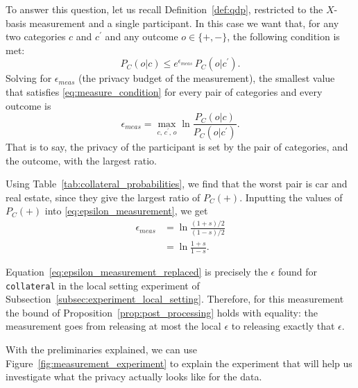 \documentclass{ieeeaccess}
\begin{document}
To answer this question, let us recall Definition~\ref{def:qdp}, restricted to the $X$-basis measurement and a single participant. In this case we want that, for any two categories $c$ and $c^{\prime}$ and any outcome $o \in \{+, -\}$, the following condition is met:
\begin{equation}
  P_C(o|c) \leq e^{\epsilon_{meas}}\, P_C(o|c^{\prime}).
  \label{eq:measure_condition}
\end{equation}
Solving for $\epsilon_{meas}$ (the privacy budget of the measurement), the smallest value that satisfies \eqref{eq:measure_condition} for every pair of categories and every outcome is
\begin{equation}
  \epsilon_{meas} = \max_{c,\, c^{\prime},\, o} \ln\frac{P_C(o|c)}{P_C(o|c^{\prime})}.
  \label{eq:epsilon_measurement}
\end{equation}
That is to say, the privacy of the participant is set by the pair of categories, and the outcome, with the largest ratio.

Using Table~\ref{tab:collateral_probabilities}, we find that the worst pair is car and real estate, since they give the largest ratio of $P_C(+)$. Inputting the values of $P_C(+)$ into \eqref{eq:epsilon_measurement}, we get
\begin{align}
  \epsilon_{meas} &= \ln\frac{(1+s)/2}{(1-s)/2} \nonumber \\
                  &= \ln\frac{1+s}{1-s}.
  \label{eq:epsilon_measurement_replaced}
\end{align}

Equation~\eqref{eq:epsilon_measurement_replaced} is precisely the $\epsilon$ found for \texttt{collateral} in the local setting experiment of Subsection~\ref{subsec:experiment_local_setting}. Therefore, for this measurement the bound of Proposition~\ref{prop:post_processing} holds with equality: the measurement goes from releasing at most the local $\epsilon$ to releasing exactly that $\epsilon$.

With the preliminaries explained, we can use Figure~\ref{fig:measurement_experiment} to explain the experiment that will help us investigate what the privacy actually looks like for the data.
\end{document}
